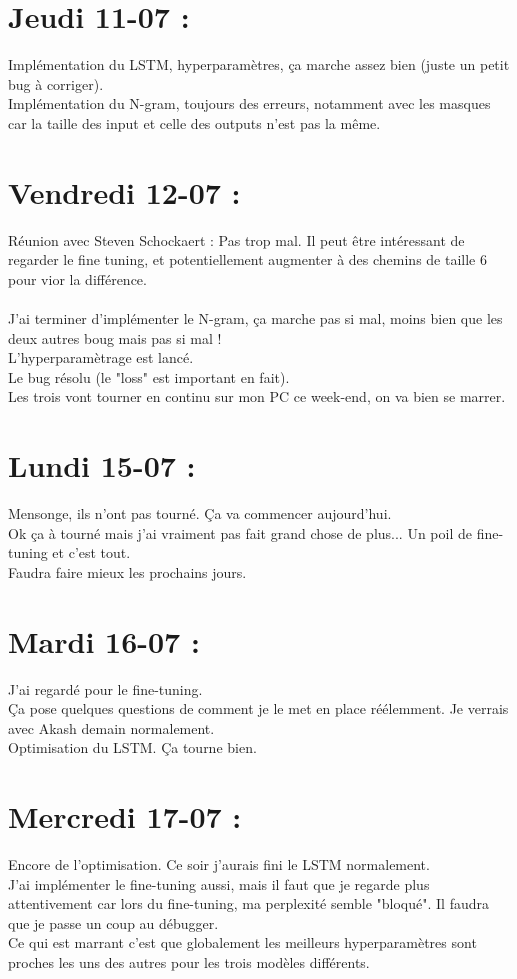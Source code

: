 \documentclass{article}
\begin{document}
\section*{Jeudi 11-07 :}
Implémentation du LSTM, hyperparamètres, ça marche assez bien (juste un petit bug à corriger).\\
Implémentation du N-gram, toujours des erreurs, notamment avec les masques car la taille des input et celle des outputs n'est pas la même.
\section*{Vendredi 12-07 :}
Réunion avec Steven Schockaert :
Pas trop mal.
Il peut être intéressant de regarder le fine tuning, et potentiellement augmenter à des chemins de taille 6 pour vior la différence.\\
\\
J'ai terminer d'implémenter le N-gram, ça marche pas si mal, moins bien que les deux autres boug mais pas si mal !\\
L'hyperparamètrage est lancé.\\
Le bug résolu (le "loss" est important en fait).\\
Les trois vont tourner en continu sur mon PC ce week-end, on va bien se marrer.
\section*{Lundi 15-07 :}
Mensonge, ils n'ont pas tourné. Ça va commencer aujourd'hui.\\
Ok ça à tourné mais j'ai vraiment pas fait grand chose de plus... Un poil de fine-tuning et c'est tout.\\
Faudra faire mieux les prochains jours.
\section*{Mardi 16-07 :}
J'ai regardé pour le fine-tuning.\\
Ça pose quelques questions de comment je le met en place réélemment. Je verrais avec Akash demain normalement.\\
Optimisation du LSTM. Ça tourne bien.\\
\section*{Mercredi 17-07 :}
Encore de l'optimisation. Ce soir j'aurais fini le LSTM normalement.\\
J'ai implémenter le fine-tuning aussi, mais il faut que je regarde plus attentivement car lors du fine-tuning, ma perplexité semble "bloqué". Il faudra que je passe un coup au débugger.\\
Ce qui est marrant c'est que globalement les meilleurs hyperparamètres sont proches les uns des autres pour les trois modèles différents.\\
\end{document}
